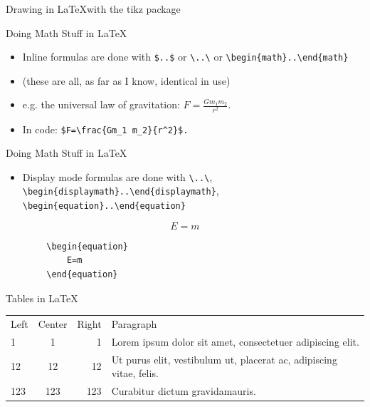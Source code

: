 \documentclass[handout]{beamer} %
\begin{document}
\begin{frame}{Drawing in \LaTeX with the tikz package}
\end{frame}	

\begin{frame}[fragile]{Doing Math Stuff in \LaTeX}
	\begin{itemize}
		\item Inline formulas are done with \verb|$..$| or \verb|\..\| or \verb|\begin{math}..\end{math}|
		\item (these are all, as far as I know, identical in use)
		\pause
		\item e.g. the universal law of gravitation: $F=\frac{Gm_1 m_2}{r^2}$.
		\pause
		\item In code: \verb|$F=\frac{Gm_1 m_2}{r^2}$.|
	\end{itemize}
\end{frame}

\begin{frame}[fragile]{Doing Math Stuff in \LaTeX}
	\begin{itemize}
		\item Display mode formulas are done with \verb|\..\|, \verb|\begin{displaymath}..\end{displaymath}|, \verb|\begin{equation}..\end{equation}|
\end{itemize}
\end{frame}
	
\begin{frame}[fragile]
	\begin{equation}
		E=m
	\end{equation}
	\pause
	\begin{Verbatim}
		\begin{equation}
			E=m
		\end{equation}
	\end{Verbatim}
\end{frame}

\begin{frame}{Tables in \LaTeX}
	\begin{tabular}{||l|c|r|p{6cm}||}
		Left & Center & Right & Paragraph \\
		1 & 1 & 1 & Lorem ipsum dolor sit amet, consectetuer adipiscing elit. \\
		12 & 12 & 12 & Ut purus elit, vestibulum ut, placerat ac, adipiscing vitae, felis. \\
		123 & 123 & 123 & Curabitur dictum gravidamauris. \\
	\end{tabular}
\end{frame}
\end{document}
